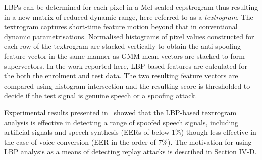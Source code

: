 LBPs can be determined for each pixel in a Mel-scaled cepstrogram thus resulting in a new matrix of reduced dynamic range, here referred to as a \emph{textrogram}.  
The textrogram captures short-time feature motion beyond that in conventional dynamic parametrisations.  
Normalised histograms of pixel values constructed for each row of the textrogram   are stacked vertically to obtain the anti-spoofing feature vector in the same manner as GMM mean-vectors are stacked to form supervectors.  
In the work reported here, LBP-based features are calculated for the both the enrolment and test data.  The two resulting feature vectors are compared using histogram intersection and the resulting score is thresholded to decide if the test signal is genuine speech or a spoofing attack.

Experimental results presented in~\cite{Alegre2013a} showed that the LBP-based textrogram analysis is effective in detecting a range of spoofed speech signals, including artificial signals and speech synthesis (EERs of below 1\%) though less effective in the case of voice conversion (EER in the order of 7\%).  The motivation for using LBP analysis as a means of detecting replay attacks is described in Section IV-D.
